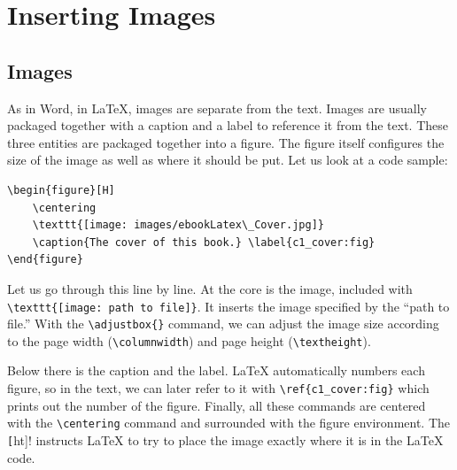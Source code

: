 \chapter{Inserting Images} \label{c2_secondchapter:cha}

\section{Images}\label{c1_images:sec}

As in Word, in \LaTeX{}, images are separate from the text. Images are usually
packaged together with a caption and a label to reference it from the text.
These three entities are packaged together into a figure. The figure itself
configures the size of the image as well as where it should be put. Let us look
at a code sample:
\begin{lstlisting}[language=Tex]
\begin{figure}[H]
    \centering
    \texttt{[image: images/ebookLatex\_Cover.jpg]}
    \caption{The cover of this book.} \label{c1_cover:fig}
\end{figure}
\end{lstlisting}

Let us go through this line by line. At the core is the image, included with
\lstinline[language=Tex]!\texttt{[image: path to file]}!. It inserts the image
specified by the ``path to file.'' With the
\lstinline[language=Tex]!\adjustbox{}! command, we can adjust the image size
according to the page width (\lstinline[language=Tex]!\columnwidth!) and page
height (\lstinline[language=Tex]!\textheight!). 

Below there is the caption and the label. \LaTeX{} automatically numbers each
figure, so in the text, we can later refer to it with
\lstinline[language=Tex]!\ref{c1_cover:fig}! which prints out the number of the
figure. Finally, all these commands are centered with the
\lstinline[language=Tex]!\centering! command and surrounded with the figure
environment. The \lstinline[language=Tex]![!ht]! instructs \LaTeX{} to try to
place the image exactly where it is in the \LaTeX{} code.

